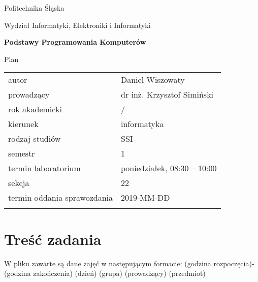 \documentclass[12pt,a4paper,twoside]{article}
\let\oldmarginpar\marginpar
\renewcommand\marginpar[1]{%
  {\linespread{0.85}\normalfont\scriptsize%
\oldmarginpar[\hspace{1cm}\begin{minipage}{3cm}\raggedleft\scriptsize\color{black}\textsf{#1}\end{minipage}]%
{\hspace{0cm}\begin{minipage}{3cm}\raggedright\scriptsize\color{black}\textsf{#1}\end{minipage}}%
}%
}
\newcounter{rok}
\newcommand{\rokakademicki}{%
   \setcounter{rok}{\number\year}%
   \ifthenelse{\number\month<10}%
   {\addtocounter{rok}{-1}}%
   {}%
   \arabic{rok}/\addtocounter{rok}{1}\arabic{rok}
}
\begin{document}
\frenchspacing
\thispagestyle{empty}
\begin{center}
{\Large\sf Politechnika Śląska   %

Wydział Informatyki, Elektroniki i Informatyki

}

\vfill

 

\vfill\vfill

{\Huge\sffamily\bfseries Podstawy Programowania Komputerów\par}  

\vfill\vfill

{\LARGE\sf Plan}   


\vfill \vfill\vfill\vfill






\begin{tabular}{ll}
	\toprule
	autor                       & Daniel Wiszowaty    \\
	prowadzący                  & dr inż. Krzysztof Simiński  \\
	rok akademicki              & \rokakademicki         \\
	kierunek                    & informatyka            \\
	rodzaj studiów              & SSI                    \\
	semestr                     & 1                      \\
	termin laboratorium         & poniedziałek, 08:30 -- 10:00 \\
	sekcja                      & 22                     \\
	termin oddania sprawozdania & 2019-MM-DD             \\
	\bottomrule
	                            &
\end{tabular}

\end{center}

\cleardoublepage

\section{Treść zadania}
\marginpar{}
W pliku zawarte są dane zajęć w następującym formacie: \newline \newline
(godzina rozpoczęcia)-(godzina zakończenia) (dzień) (grupa) (prowadzący) (przedmiot)
\newline
\end{document}
